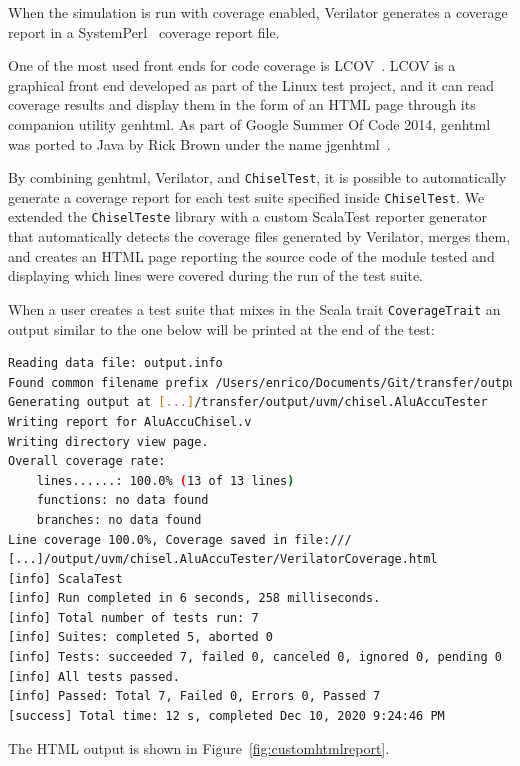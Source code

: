 \documentclass[conference]{IEEEtran}
\begin{document}
When the simulation is run with coverage enabled, Verilator generates a coverage report in a SystemPerl~\cite{SystemPerl} coverage report file.

One of the most used front ends for code coverage is LCOV~\cite{Lcov}. LCOV is a graphical front end developed as part of the Linux test project, and it can read coverage results and display them in the form of an HTML page through its companion utility genhtml. As part of Google Summer Of Code 2014, genhtml was ported to Java by Rick Brown under the name jgenhtml~\cite{jgenhtml}.

By combining genhtml, Verilator, and \texttt{ChiselTest}, it is possible to automatically generate a coverage report for each test suite specified inside \texttt{ChiselTest}. We extended the \texttt{ChiselTeste} library with a custom ScalaTest reporter generator that automatically detects the coverage files generated by Verilator, merges them, and creates an HTML page reporting the source code of the module tested and displaying which lines were covered during the run of the test suite.

When a user creates a test suite that mixes in the Scala trait \texttt{CoverageTrait} an output similar to the one below will be printed at the end of the test:
\begin{lstlisting}[language=bash]
Reading data file: output.info
Found common filename prefix /Users/enrico/Documents/Git/transfer/output/uvm/
Generating output at [...]/transfer/output/uvm/chisel.AluAccuTester
Writing report for AluAccuChisel.v
Writing directory view page.
Overall coverage rate:
	lines......: 100.0% (13 of 13 lines)
	functions: no data found
	branches: no data found
Line coverage 100.0%, Coverage saved in file:///
[...]/output/uvm/chisel.AluAccuTester/VerilatorCoverage.html
[info] ScalaTest
[info] Run completed in 6 seconds, 258 milliseconds.
[info] Total number of tests run: 7
[info] Suites: completed 5, aborted 0
[info] Tests: succeeded 7, failed 0, canceled 0, ignored 0, pending 0
[info] All tests passed.
[info] Passed: Total 7, Failed 0, Errors 0, Passed 7
[success] Total time: 12 s, completed Dec 10, 2020 9:24:46 PM
\end{lstlisting}

The HTML output is shown in Figure~\ref{fig:customhtmlreport}.
\end{document}
